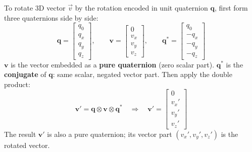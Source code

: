 \documentclass[12pt, a4paper]{article}
\begin{document}
To rotate 3D vector $\vec{v}$ by the rotation encoded in unit quaternion
$\mathbf{q}$, first form three quaternions side by side:
\[
  \mathbf{q}
  = \begin{bmatrix} q_0 \\ q_x \\ q_y \\ q_z \end{bmatrix},
  \qquad
  \mathbf{v}
  = \begin{bmatrix} 0 \\ v_x \\ v_y \\ v_z \end{bmatrix},
  \qquad
  \mathbf{q}^*
  = \begin{bmatrix} q_0 \\ -q_x \\ -q_y \\ -q_z \end{bmatrix}
\]
$\mathbf{v}$ is the vector embedded as a \textbf{pure quaternion} (zero scalar
part). $\mathbf{q}^*$ is the \textbf{conjugate} of $\mathbf{q}$: same scalar,
negated vector part.
Then apply the double product:
\[
  \mathbf{v}' = \mathbf{q} \otimes \mathbf{v} \otimes \mathbf{q}^*
  \quad\Longrightarrow\quad
  \mathbf{v}'
  = \begin{bmatrix} 0 \\ v_x' \\ v_y' \\ v_z' \end{bmatrix}
\]
The result $\mathbf{v}'$ is also a pure quaternion; its vector part
$(v_x', v_y', v_z')$ is the rotated vector.
\end{document}
